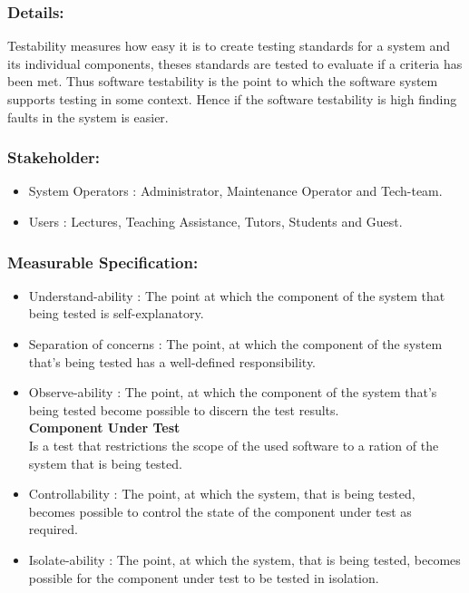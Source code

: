 \documentclass[11pt]{article}
\begin{document}
		\subsubsection{Details:}
			\textbf{}Testability measures how easy it is to create testing standards for a system and its individual components, theses standards are tested to evaluate if a criteria has been met. Thus software testability is the point to which the software system supports testing in some context. Hence if the software testability is high finding faults in the system is easier.
		
		\subsubsection{Stakeholder:}
		\begin{itemize}
			\item System Operators : Administrator, Maintenance Operator and Tech-team.
			\item Users : Lectures, Teaching Assistance, Tutors, Students and Guest.
			\end{itemize}		
		
		\subsubsection{Measurable Specification:}
		\begin{itemize}
			\item Understand-ability : The point at which the component of the system that being tested is self-explanatory.
			\item Separation of concerns : The point, at which the component of the system that's being tested has a well-defined responsibility.
			\item Observe-ability : The point, at which the component of the system that’s being tested become possible to discern the test results. \\
						
			\textbf{Component Under Test}\\
			Is a test that restrictions the scope of the used software to a ration of the system that is being tested.
			
			\item Controllability : The point, at which the system, that is being tested, becomes possible to control the state of the component under test as required.
			\item Isolate-ability : The point, at which the system, that is being tested, becomes possible for the component under test to be tested in isolation.
			
		\end{itemize}
		
\end{document}
